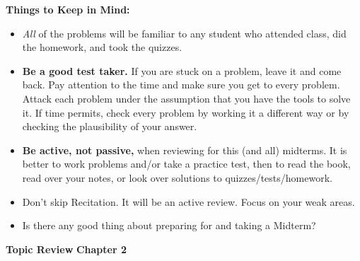 \documentclass[12pt]{article}
\begin{document}
\textbf{Things to Keep in Mind:}
\begin{itemize}
	\item \emph{All} of the problems will be familiar to any student who attended class, did the homework, and took the quizzes.
	\item \textbf{Be a good test taker.} If you are stuck on a problem, leave it and come back. Pay attention to the time and make sure you get to every problem. Attack each problem under the assumption that you have the tools to solve it. If time permits, check every problem by working it a different way or by checking the plausibility of your answer.
	\item \textbf{Be active, not passive,} when reviewing for this (and all) midterms. It is better to work problems and/or take a practice test, then to read the book, read over your notes, or look over solutions to quizzes/tests/homework.
	\item Don't skip Recitation. It will be an active review. Focus on your weak areas.
	\item Is there any good thing about preparing for and taking a Midterm?
\end{itemize}
\textbf{Topic Review}
\textbf{Chapter 2}
\end{document}
